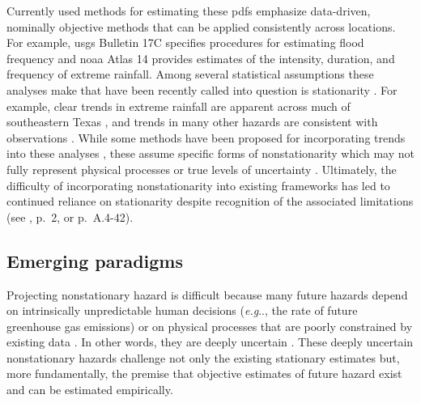 \documentclass[11pt]{article}
\makeatletter
\DeclareRobustCommand\onedot{\futurelet\@let@token\@onedot}
\def\@onedot{\ifx\@let@token.\else.\null\fi\xspace}
\def\eg{\emph{e.g}\onedot} \def\Eg{\emph{E.g}\onedot}
\DeclareRobustCommand\onedot{\futurelet\@let@token\@onedot}
\def\@onedot{\ifx\@let@token.\else.\null\fi\xspace}
\def\eg{\emph{e.g}\onedot} \def\Eg{\emph{E.g}\onedot}
\makeatother
\begin{document}
Currently used methods for estimating these \glspl{pdf} emphasize data-driven, nominally objective methods that can be applied consistently across locations.
For example, \gls{usgs} Bulletin 17C specifies procedures for estimating flood frequency and \gls{noaa} Atlas 14 provides estimates of the intensity, duration, and frequency of extreme rainfall.
Among several statistical assumptions these analyses make that have been recently called into question is stationarity \citep[the assumption that past and future hazard come from the same \gls{pdf}; see][for a review]{milly_stationarity:2008,merz_review:2014}.
For example, clear trends in extreme rainfall are apparent across much of southeastern Texas \citep{fagnant_spatiotemporal:2020,nielsen-gammon_txrainfall:2020}, and trends in many other hazards are consistent with observations \citep[see][for a comprehensive summary]{ipcc_impacts:2022}.
While some methods have been proposed for incorporating trends into these analyses \citep[see][for a review]{Salas:2018ge}, these assume specific forms of nonstationarity which may not fully represent physical processes or true levels of uncertainty \citep{DossGollin:2019,Montanari:2014hl,Serinaldi:2015bq}.
Ultimately, the difficulty of incorporating nonstationarity into existing frameworks has led to continued reliance on stationarity despite recognition of the associated limitations (see \cite{bulletin17c:2019}, p.~2, or \cite{atlas14_texas:2018} p.~A.4-42).

\subsection{Emerging paradigms}

Projecting nonstationary hazard is difficult because many future hazards depend on intrinsically unpredictable human decisions (\eg, the rate of future greenhouse gas emissions) or on physical processes that are poorly constrained by existing data \citep[\eg, collapse of the West Antarctic ice sheet; see][]{deconto_antarctica:2016}.
In other words, they are deeply uncertain \citep{keller_management:2021,walker_deep:2013,lempert_complex:2002}.
These deeply uncertain nonstationary hazards challenge not only the existing stationary estimates but, more fundamentally, the premise that objective estimates of future hazard exist and can be estimated empirically.
\end{document}
